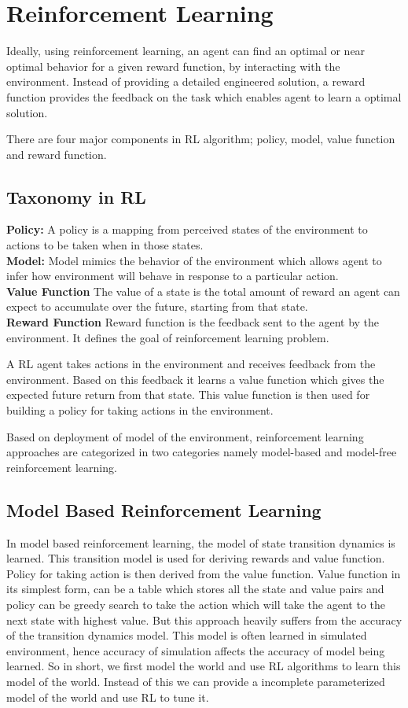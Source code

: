 \documentclass[thesis]{mas_proposal}
\begin{document}
\chapter{Reinforcement Learning}

Ideally, using reinforcement learning, an agent can find an optimal or near optimal behavior for a given reward function, by interacting with the environment. Instead of providing a detailed engineered solution, a reward function provides the feedback on the task which enables agent to learn a optimal solution.  

There are four major components in RL algorithm; policy, model, value function and reward function.

\section{Taxonomy in RL}

\textbf{Policy:}
A policy is a mapping from perceived states of the environment to actions to be taken when in those states. \\
\textbf{Model:}
Model mimics the behavior of the environment which allows agent to infer how environment will behave in response to a particular action. \\
\textbf{Value Function}
The value of a state is the total amount of reward an agent can expect to accumulate over the future, starting from that state. \\
\textbf{Reward Function}
Reward function is the feedback sent to the agent by the environment. It defines the goal of reinforcement learning problem.

A RL agent takes actions in the environment and receives feedback from the environment. Based on this feedback it learns a value function which gives the expected future return from that state. This value function is then used for building a policy for taking actions in the environment. 

Based on deployment of model of the environment, reinforcement learning approaches are categorized in two categories namely model-based and model-free reinforcement learning.


\section{Model Based Reinforcement Learning} \label{mod-RL}
In model based  reinforcement learning, the model of state transition dynamics is learned. This transition model is used for deriving rewards and value function. Policy for taking action is then derived from the value function. Value function in its simplest form, can be a table which stores all the state and value pairs and policy can be greedy search to take the action which will take the agent to the next state with highest value. But this approach heavily suffers from the accuracy of the transition dynamics model. This model is often learned in simulated environment, hence accuracy of simulation affects the accuracy of model being learned. So in short, we first model the world and use RL algorithms to learn this model of the world. Instead of this we can provide a incomplete parameterized model of the world and use RL to tune it.  
\end{document}
